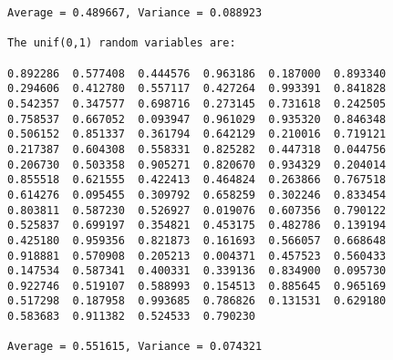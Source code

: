 \documentclass{article}
\begin{document}
{\begin{verbatim}
Average = 0.489667, Variance = 0.088923

The unif(0,1) random variables are:

0.892286  0.577408  0.444576  0.963186  0.187000  0.893340  
0.294606  0.412780  0.557117  0.427264  0.993391  0.841828  
0.542357  0.347577  0.698716  0.273145  0.731618  0.242505  
0.758537  0.667052  0.093947  0.961029  0.935320  0.846348  
0.506152  0.851337  0.361794  0.642129  0.210016  0.719121  
0.217387  0.604308  0.558331  0.825282  0.447318  0.044756  
0.206730  0.503358  0.905271  0.820670  0.934329  0.204014  
0.855518  0.621555  0.422413  0.464824  0.263866  0.767518  
0.614276  0.095455  0.309792  0.658259  0.302246  0.833454  
0.803811  0.587230  0.526927  0.019076  0.607356  0.790122  
0.525837  0.699197  0.354821  0.453175  0.482786  0.139194  
0.425180  0.959356  0.821873  0.161693  0.566057  0.668648  
0.918881  0.570908  0.205213  0.004371  0.457523  0.560433  
0.147534  0.587341  0.400331  0.339136  0.834900  0.095730  
0.922746  0.519107  0.588993  0.154513  0.885645  0.965169  
0.517298  0.187958  0.993685  0.786826  0.131531  0.629180  
0.583683  0.911382  0.524533  0.790230  

Average = 0.551615, Variance = 0.074321

\end{verbatim}
}
\end{document}
